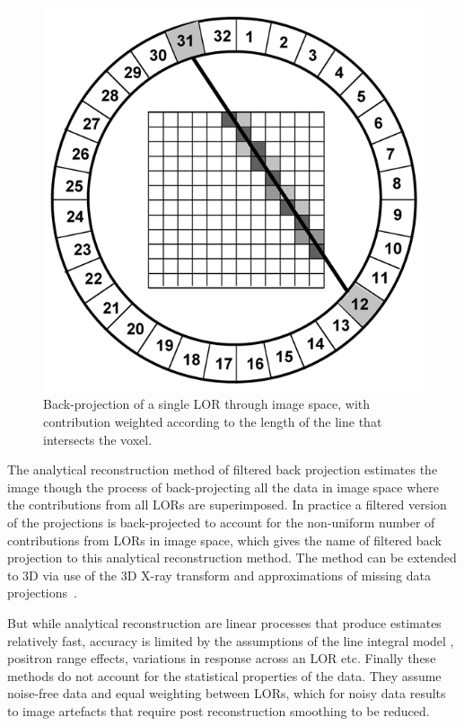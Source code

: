 \begin{figure} [h!]
\centering
\includegraphics[scale=0.35,angle=0]{2_Theory_Methods/figures/Radon_Discrete.png}
\caption{Back-projection of a single LOR through image space, with contribution weighted according to the length of the line that intersects the voxel.} 
\label{fig_3:back_projection.}
\end{figure} 

The analytical reconstruction method of filtered back projection estimates the image though the process of back-projecting all the data in image space where the contributions from all LORs are superimposed. In practice a filtered version of the projections is back-projected to account for the non-uniform number of contributions from LORs in image space, which gives the name of filtered back projection to this analytical reconstruction method. The method can be extended to 3D via use of the 3D X-ray transform and approximations of missing data projections~\cite{Kinahan1989}. 

But while analytical reconstruction are linear processes that produce estimates relatively fast, accuracy is limited by the assumptions of the line integral model , positron range effects, variations in response across an LOR etc. Finally these methods do not account for the statistical properties of the data. They assume noise-free data and equal weighting between LORs, which for noisy data results to image artefacts that require post reconstruction smoothing to be reduced. 


